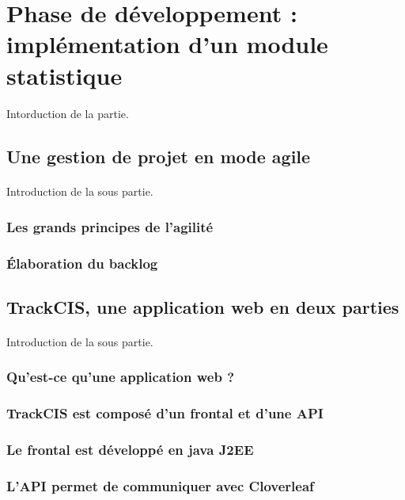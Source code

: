 \section{Phase de développement : implémentation d'un module statistique}
	\paragraph{}
	Intorduction de la partie.
	
	\subsection{Une gestion de projet en mode agile}
		\paragraph{}
		Introduction de la sous partie.
		
		\subsubsection{Les grands principes de l'agilité}
		\subsubsection{Élaboration du backlog}
	
	\subsection{TrackCIS, une application web en deux parties}
		\paragraph{}
		Introduction de la sous partie.
		
		\subsubsection{Qu'est-ce qu'une application web ?}
		\subsubsection{TrackCIS est composé d'un frontal et d'une API}
		\subsubsection{Le frontal est développé en java J2EE}
		\subsubsection{L'API permet de communiquer avec Cloverleaf}
	
